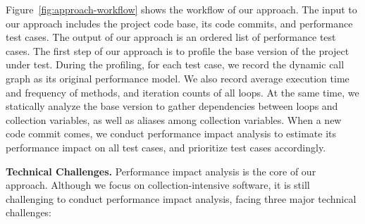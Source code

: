 Figure~\ref{fig:approach-workflow} shows the workflow of our approach. The input to our approach includes the project code base, its code commits, and performance test cases. The output of our approach is an ordered list of performance test cases. The first step of our approach is to  profile the base version of the project under test. During the profiling, for each test case, we record the dynamic call graph as its original performance model. We also record average execution time and frequency of methods, and iteration counts of all loops. At the same time, we statically analyze the base version to gather dependencies between loops and collection variables, as well as aliases among collection variables. When a new code commit comes, we conduct performance impact analysis to estimate its performance impact on all test cases, and prioritize test cases accordingly. 





 
 


\textbf{Technical Challenges.} Performance impact analysis is the core of our approach. Although we focus on collection-intensive software, it is still challenging to conduct performance impact analysis, facing three major technical challenges:


